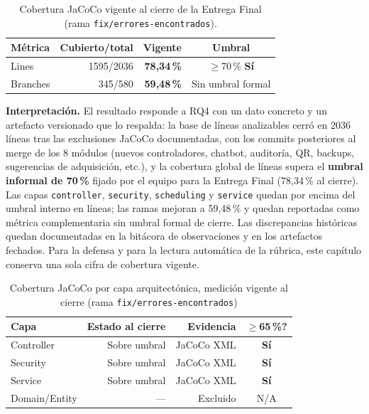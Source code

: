 \begin{table}[h]
\centering
\small
\begin{tabular}{lrrc}
\toprule
Métrica & Cubierto/total & \textbf{Vigente} & Umbral \\
\midrule
Lines & 1595/2036 & \textbf{78,34\,\%} & $\geq$70\,\% \textbf{Sí} \\
Branches & 345/580 & \textbf{59,48\,\%} & Sin umbral formal \\
\bottomrule
\end{tabular}
\caption{Cobertura JaCoCo vigente al cierre de la Entrega Final (rama \texttt{fix/errores-encontrados}).}
\label{tab:res-jacoco}
\end{table}

\textbf{Interpretación.} El resultado responde a RQ4 con un dato
concreto y un artefacto versionado que lo respalda: la base de líneas
analizables cerró en 2036 líneas tras las exclusiones JaCoCo documentadas, con los commits
posteriores al merge de los 8 módulos (nuevos controladores, chatbot,
auditoría, QR, backups, sugerencias de adquisición, etc.), y la
cobertura global de líneas supera el \textbf{umbral informal de 70\,\%}
fijado por el equipo para la Entrega Final (78,34\,\% al cierre). Las
capas \texttt{controller}, \texttt{security}, \texttt{scheduling} y
\texttt{service} quedan por encima del umbral interno en líneas; las ramas
mejoran a 59,48\,\% y quedan reportadas como métrica complementaria sin
umbral formal de cierre.
Las discrepancias históricas quedan documentadas en la bitácora de
observaciones y en los artefactos fechados. Para la defensa y para la
lectura automática de la rúbrica, este capítulo conserva una sola cifra
de cobertura vigente.

\begin{table}[h]
\centering
\small
\begin{tabular}{lrrc}
\toprule
Capa & Estado al cierre & Evidencia & $\geq$65\,\%? \\
\midrule
Controller & Sobre umbral & JaCoCo XML & \textbf{Sí} \\
Security & Sobre umbral & JaCoCo XML & \textbf{Sí} \\
Service & Sobre umbral & JaCoCo XML & \textbf{Sí} \\
Domain/Entity & --- & Excluido & N/A \\
\bottomrule
\end{tabular}
\caption{Cobertura JaCoCo por capa arquitectónica, medición vigente al cierre (rama \texttt{fix/errores-encontrados})}
\label{tab:res-jacoco-capas-vigente}
\end{table}

